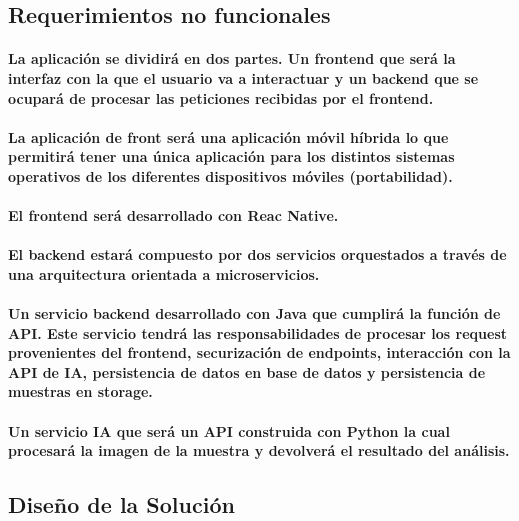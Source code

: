 \documentclass[a4paper,11pt,twocolumn]{article}
\begin{document}
\subsection{Requerimientos no funcionales}
\paragraph{La aplicación se dividirá en dos partes. Un frontend que será la interfaz con la que el usuario va a interactuar y un backend que se ocupará de procesar las peticiones recibidas por el frontend.}
\paragraph{La aplicación de front será una aplicación móvil híbrida lo que permitirá tener una única aplicación para los distintos sistemas operativos de los diferentes dispositivos móviles (portabilidad).}
\paragraph{El frontend será desarrollado con Reac Native\cite{react}.}
\paragraph{El backend estará compuesto por dos servicios orquestados a través de una arquitectura orientada a microservicios.}
\paragraph{Un servicio backend desarrollado con Java que cumplirá la función de API. Este servicio tendrá las responsabilidades de procesar los request provenientes del frontend, securización de endpoints, interacción con la API de IA, persistencia de datos en base de datos y persistencia de muestras en storage\cite{java}.}
\paragraph{Un servicio IA que será un API construida con Python la cual procesará la imagen de la muestra y devolverá el resultado del análisis.}
\subsection{Diseño de la Solución}
\end{document}
